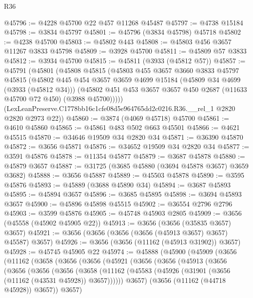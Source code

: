 \begin{lexlean}{R36}
\begin{coremodule}
@45796 := @4228 @45700 @22 @457 @11268 @45487
@45797 := @4738 @15184
@45798 := @3834 @45797
@45801 := @45796 (@3834 @45798) @45718
@45802 := @4238 @45700
@45803 := @45802 @443
@45808 := @45803 @456 @3657 @11267 @3833 @45798
@45809 := @3928 @45700
@45811 := @45809 @57 @3833
@45812 := @3934 @45700
@45815 := @45811 (@3933 (@45812 @57))
@45857 := @45791
    (@45801
      (@45808
        @45815
        (@45803
          @455
          @3657
          @3660
          @3833
          @45797
          @45815
          (@45802
            @445
            @454
            @3657
            @3659
            @4699
            @15184
            (@45809 @34 @4699 (@3933 (@45812 @34)))
            (@45802 @451 @453 @3657 @3657 @450 @2687 (@11633 @45700 @72 @450) (@3988 @45700)))))
      (LexLeanPreserve.C1778bb16c1cfe08d5e964765dd2c0216.R36.__rel_1 @2820 @2820 @2973 @22))
@45860 := @3874 (@4069 @45718) @45700
@45861 := @4610 @45860
@45865 := @45861 @483 @502 @663 @45501
@45866 := @4621 @45515
@45870 := @34646 @19509 @34 @2820 @34
@45871 := @36390 @45870
@45872 := @3656 @45871
@45876 := @34652 @19509 @34 @2820 @34
@45877 := @3591 @45876
@45878 := @11354 @45877
@45879 := @3687 @45878
@45880 := @45879 @3657
@45887 := @31725 (@3685 @45880 (@3694 @45878 @3657) @3659 @3682)
@45888 := @3656 @45887
@45889 := @45503 @45878
@45890 := @3595 @45876
@45893 := @45889 (@3688 @45890 @34)
@45894 := @3687 @45893
@45895 := @45894 @3657
@45896 := @3685 @45895
@45898 := @3694 @45893 @3657
@45900 := @45896 @45898 @45515
@45902 := @36554 @2796 @2796
@45903 := @3599 @45876
@45905 := @45748 @45903 @2805
@45909 := @3656 (@45558 (@45902 @45905 @22))
@45913 := @3656 (@3656 (@35835 @3657) @3657)
@45921 := @3656 (@3656 (@3656 (@3656 (@45913 @3657) @3657) @45587) @3657)
@45926 := @3656 (@3656 (@11162 (@45913 @31902)) @3657)
@45928 := @45745 @45905 @22
@45974 := @45888
    (@45900
      (@45909
        (@3656
          (@11162
            (@3658
              (@3656
                (@3656
                  (@45921
                    (@3656
                      (@3656
                        (@45913
                          (@3656
                            (@3656
                              (@3656
                                (@3656
                                  (@3658
                                    (@11162
                                      (@45583
                                        (@45926 (@31901 (@3656 (@11162 (@43531 @45928)) @3657))))))
                                  @3657)
                                (@3656 (@11162 (@44718 @45928)) @3657))
                              @3657)

\end{coremodule}
\end{lexlean}
